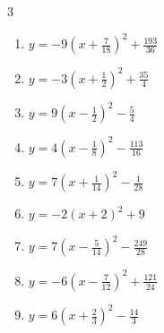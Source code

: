 \begin{multicols}{3}
\begin{enumerate}

  \item $\displaystyle y=-9\left( x+\frac{7}{18}\right)^{2}+\frac{193}{36}$


\columnbreak %

\resetques

  \item $\displaystyle y=-3\left( x+\frac{1}{2}\right)^{2}+\frac{35}{4}$


  \item $\displaystyle y=9\left( x-\frac{1}{2}\right)^{2}-\frac{5}{4}$


  \item $\displaystyle y=4\left( x-\frac{1}{8}\right)^{2}-\frac{113}{16}$


  \item $\displaystyle y=7\left( x+\frac{1}{14}\right)^{2}-\frac{1}{28}$


  \item $\displaystyle y=-2\left( x+2\right)^{2}+9$

        \phantom{$\displaystyle 頂点\left( -2 , 9 \right)$}

  \item $\displaystyle y=7\left( x-\frac{5}{14}\right)^{2}-\frac{249}{28}$


  \item $\displaystyle y=-6\left( x-\frac{7}{12}\right)^{2}+\frac{121}{24}$


  \item $\displaystyle y=6\left( x+\frac{2}{3}\right)^{2}-\frac{14}{3}$



\end{enumerate}
\end{multicols}
